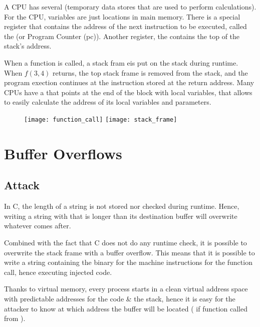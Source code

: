 A CPU has several  (temporary data stores that are used to perform calculations). For the CPU, variables are just locations in main memory. There is a special register that contains the address of the next instruction to be executed, called the  (or Program Counter (pc)). Another register, the  contains the top of the stack's address.

When a function is called, a stack fram eis put on the stack during runtime. When $f(3, 4)$ returns, the top stack frame is removed from the stack, and the program exection continues at the instruction stored at the return address. Many CPUs have a  that points at the end of the block with local variables, that allows to easily calculate the address of its local variables and parameters.

\begin{figure}[H]
    \centering
    \texttt{[image: function\_call]}\hfill
	\texttt{[image: stack\_frame]}
\end{figure}

\endgroup

\chapter{Buffer Overflows}

\section{Attack}

In C, the length of a string is not stored nor checked during runtime. Hence, writing a string with  that is longer than its destination buffer will overwrite whatever comes after. 

Combined with the fact that C does not do any runtime check, it is possible to overwrite the stack frame with a buffer overflow. This means that it is possible to write a string containing the binary for the machine instructions for the function call, hence executing injected code.

Thanks to virtual memory, every process starts in a clean virtual address space with predictable addresses for the code \& the stack, hence it is easy for the attacker to know at which address the buffer will be located ( if function  called from ).

